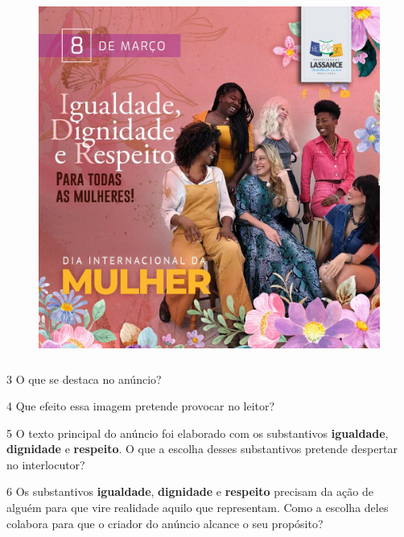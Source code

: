 \begin{itemize}
\begin{itemize}
\begin{figure}
\centering
\includegraphics[width=4.61389in,height=4.61389in]{./_SAEB_9_POR/media/image20.jpeg}
\caption{}
\end{figure}

\num{3} O que se destaca no anúncio? 

\num{4} Que efeito essa imagem pretende provocar no leitor? 

\num{5} O texto principal do anúncio foi elaborado com os substantivos
\textbf{igualdade}, \textbf{dignidade} e \textbf{respeito}. O que a
escolha desses substantivos pretende despertar no interlocutor?

\num{6} Os substantivos \textbf{igualdade}, \textbf{dignidade} e
\textbf{respeito} precisam da ação de alguém para que vire realidade
aquilo que representam. Como a escolha deles colabora para que o criador
do anúncio alcance o seu propósito? 


\end{itemize}
\end{itemize}
